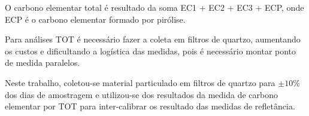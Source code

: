 O carbono elementar total é resultado da soma EC1 + EC2 + EC3 + ECP,
onde ECP é o carbono elementar formado por pirólise. 

Para análises TOT é necessário fazer a coleta em filtros
de quartzo, aumentando os custos e dificultando a logística das medidas, 
pois é necessário montar ponto de medida paralelos.  

Neste trabalho, coletou-se material particulado em filtros de 
quartzo para $\pm 10\%$ dos dias de amostragem e utilizou-se
dos resultados da medida de carbono elementar por TOT 
para inter-calibrar os resultado das medidas de refletância. 
